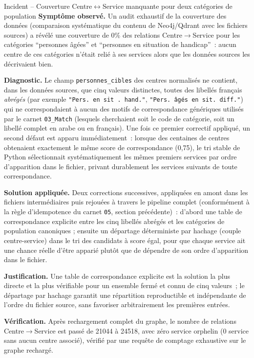 \begin{probbox}{Incident -- Couverture Centre$\leftrightarrow$Service manquante pour deux catégories de population}
\textbf{Symptôme observé.} Un audit exhaustif de la couverture des données (comparaison systématique du contenu de Neo4j/Qdrant avec les fichiers sources) a révélé une couverture de 0\% des relations Centre$\to$Service pour les catégories ``personnes âgées'' et ``personnes en situation de handicap''~: aucun centre de ces catégories n'était relié à ses services alors que les données sources les décrivaient bien.

\textbf{Diagnostic.} Le champ \texttt{personnes\_cibles} des centres normalisés ne contient, dans les données sources, que cinq valeurs distinctes, toutes des libellés français \emph{abrégés} (par exemple \texttt{"Pers. en sit . hand."}, \texttt{"Pers. âgés en sit. diff."}) qui ne correspondaient à aucun des motifs de correspondance génériques utilisés par le carnet \texttt{03\_Match} (lesquels cherchaient soit le code de catégorie, soit un libellé complet en arabe ou en français). Une fois ce premier correctif appliqué, un second défaut est apparu immédiatement~: lorsque des centaines de centres obtenaient exactement le même score de correspondance (0,75), le tri stable de Python sélectionnait systématiquement les mêmes premiers services par ordre d'apparition dans le fichier, privant durablement les services suivants de toute correspondance.

\textbf{Solution appliquée.} Deux corrections successives, appliquées en amont dans les fichiers intermédiaires puis rejouées à travers le pipeline complet (conformément à la règle d'idempotence du carnet \texttt{05}, section précédente)~: d'abord une table de correspondance explicite entre les cinq libellés abrégés et les catégories de population canoniques ; ensuite un départage déterministe par hachage (couple centre-service) dans le tri des candidats à score égal, pour que chaque service ait une chance réelle d'être apparié plutôt que de dépendre de son ordre d'apparition dans le fichier.

\textbf{Justification.} Une table de correspondance explicite est la solution la plus directe et la plus vérifiable pour un ensemble fermé et connu de cinq valeurs~; le départage par hachage garantit une répartition reproductible et indépendante de l'ordre du fichier source, sans favoriser arbitrairement les premières entrées.

\textbf{Vérification.} Après rechargement complet du graphe, le nombre de relations Centre$\to$Service est passé de 21044 à 24518, avec zéro service orphelin (0 service sans aucun centre associé), vérifié par une requête de comptage exhaustive sur le graphe rechargé.
\end{probbox}
